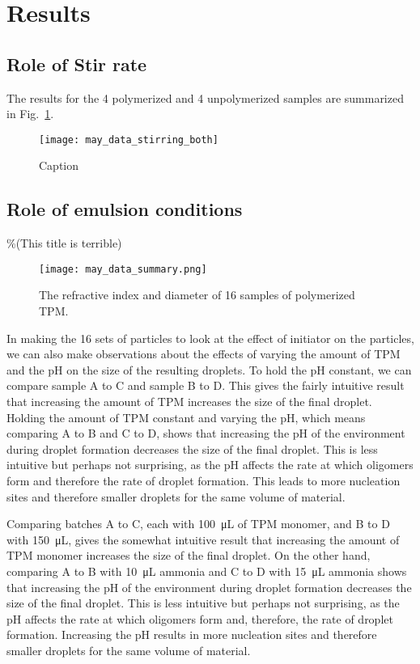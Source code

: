 \section{Results}

\subsection{Role of Stir rate}

The results for the \num{4} polymerized and \num{4} unpolymerized
samples are summarized in Fig.~\ref{fig:stir_rate}.

\begin{figure}
    \centering
    \texttt{[image: may\_data\_stirring\_both]}
    \caption{Caption}
    \label{fig:stir_rate}
\end{figure}


\subsection{Role of emulsion conditions}
\%(This title is terrible)


\begin{figure}
    \centering
    \texttt{[image: may\_data\_summary.png]}
    \caption{The refractive index and diameter of 16 samples of 
    polymerized TPM.}
    \label{fig:initiator_data}
\end{figure}

In making the \si{16} sets of particles to look at the effect of initiator on 
the particles, we can also make observations about the effects of varying 
the amount of TPM and the pH on the size of the resulting droplets. To hold 
the pH constant, we can compare sample A to C and sample B to D. This gives 
the fairly intuitive result that increasing the amount of TPM increases the 
size of the final droplet. Holding the amount of TPM constant and varying 
the pH, which means comparing A to B and C to D, shows that increasing the 
pH of the environment during droplet formation decreases the size of the 
final droplet. This is less intuitive but perhaps not surprising, as the pH 
affects the rate at which oligomers form and therefore the rate of droplet 
formation. This leads to more nucleation sites and therefore smaller droplets 
for the same volume of material. 

Comparing batches A to C, each with \SI{100}{\micro \liter} of TPM monomer, and B to D with
\SI{150}{\micro \liter}, gives the somewhat intuitive result that increasing the amount of TPM
monomer increases the size of the final droplet. On the other hand, comparing A to B with
\SI{10}{\micro \liter} ammonia and C to D with \SI{15}{\micro \liter} ammonia shows that
increasing the pH of the environment during droplet formation decreases the size of the 
final droplet. This is less intuitive but perhaps not surprising, as the pH 
affects the rate at which oligomers form and, therefore, the rate of droplet 
formation. Increasing the pH results in more nucleation sites and therefore smaller droplets 
for the same volume of material. 

